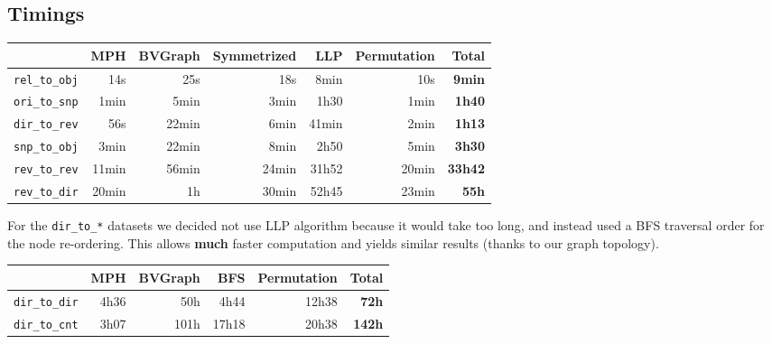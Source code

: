 \documentclass[11pt,a4paper]{article}
\begin{document}

\subsection{Timings}

\begin{center}
    \begin{tabular}{@{} l *6r @{}}
        \toprule
        \multicolumn{1}{c}{} &
            \textbf{MPH} &
            \textbf{BVGraph} &
            \textbf{Symmetrized} &
            \textbf{LLP} &
            \textbf{Permutation} &
            \textbf{Total} \\
        \midrule
        \texttt{rel\_to\_obj}
            & 14s & 25s & 18s & 8min & 10s & \textbf{9min} \\
        \texttt{ori\_to\_snp}
            & 1min & 5min & 3min & 1h30 & 1min & \textbf{1h40} \\
        \texttt{dir\_to\_rev}
            & 56s & 22min & 6min & 41min & 2min & \textbf{1h13} \\
        \texttt{snp\_to\_obj}
            & 3min & 22min & 8min & 2h50 & 5min & \textbf{3h30} \\
        \texttt{rev\_to\_rev}
            & 11min & 56min & 24min & 31h52 & 20min & \textbf{33h42} \\
        \texttt{rev\_to\_dir}
            & 20min & 1h & 30min & 52h45 & 23min & \textbf{55h} \\
        \bottomrule
    \end{tabular}
\end{center}

\vspace{0.5cm}

For the \texttt{dir_to_*} datasets we decided not use LLP algorithm
because it would take too long, and instead used a BFS traversal order for the
node re-ordering. This allows \textbf{much} faster computation and yields
similar results (thanks to our graph topology).

\vspace{0.5cm}

\begin{center}
    \begin{tabular}{@{} l *5r @{}}
        \toprule
        \multicolumn{1}{c}{} &
            \textbf{MPH} &
            \textbf{BVGraph} &
            \textbf{BFS} &
            \textbf{Permutation} &
            \textbf{Total} \\
        \midrule
        \texttt{dir\_to\_dir}
            & 4h36 & 50h & 4h44 & 12h38 & \textbf{72h} \\
        \texttt{dir\_to\_cnt}
            & 3h07 & 101h & 17h18 & 20h38 & \textbf{142h} \\
        \bottomrule
    \end{tabular}
\end{center}
\end{document}
